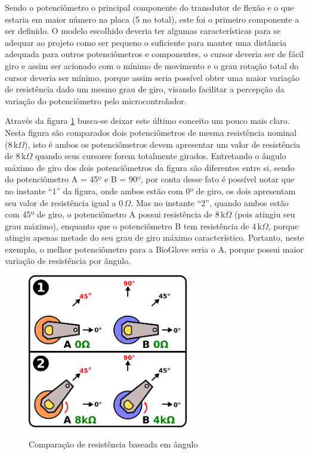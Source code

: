 \documentclass[
	12pt,				%
	openright,			%
	oneside,			%
	a4paper,			%
	english,			%
	brazil				%
	]{abntex2}
\begin{document}
			Sendo o potenciômetro o principal componente do transdutor de flexão e o que estaria em maior número na placa (5 no total), este foi o primeiro componente a ser definido. O modelo escolhido deveria ter algumas características para se adequar ao projeto como ser pequeno o suficiente para manter uma distância adequada para outros potenciômetros e componentes, o cursor deveria ser de fácil giro e assim ser acionado com o mínimo de movimento e o grau rotação total do cursor deveria ser mínimo, porque assim seria possível obter uma maior variação de resistência dado um mesmo grau de giro, visando facilitar a percepção da variação do potenciômetro pelo microcontrolador. 
			
			Através da figura \ref{Fig:pot-comparison} busca-se deixar este último conceito um pouco mais claro. Nesta figura são comparados dois potenciômetros de mesma resistência nominal (8$\,$k$\Omega$), isto é ambos os potenciômetros devem apresentar um valor de resistência de 8$\,$k$\Omega$ quando seus cursores forem totalmente girados. Entretando o ângulo máximo de giro dos dois potenciômetros da figura são diferentes entre si, sendo do potenciômetro A = 45º e B = 90º, por conta desse fato é possível notar que no instante ``1'' da figura, onde ambos estão com 0º de giro, os dois apresentam seu valor de resistência igual a 0$\,\Omega$. Mas no instante ``2'', quando ambos estão com 45º de giro, o potenciômetro A possui resistência de 8$\,$k$\Omega$ (pois atingiu seu grau máximo), enquanto que o potenciômetro B tem resistência de 4$\,$k$\Omega$, porque atingiu apenas metade do seu grau de giro máximo característico. Portanto, neste exemplo, o melhor potenciômetro para a BioGlove seria o A, porque possui maior variação de resistência por ângulo.

		\begin{figure}[h!]
			\centering
			\caption{Comparação de resistência baseada em ângulo}
  		\includegraphics[width=7cm]{./figures/pot-comparison.png}
  		\label{Fig:pot-comparison}
		\end{figure}
			
\end{document}
